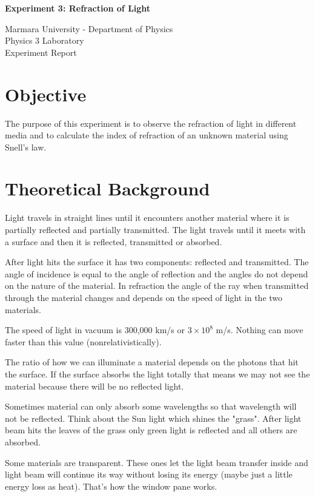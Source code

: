 \documentclass[12pt, a4paper]{article}
\begin{document}
\begin{center}
	\Large \textbf{Experiment 3: Refraction of Light}
	\vspace{0.5cm}
	
	\normalsize Marmara University - Department of Physics \\
	Physics 3 Laboratory \\
	Experiment Report
	\vspace{0.5cm}
\end{center}

\section{Objective}
The purpose of this experiment is to observe the refraction of light in different media and to calculate the index of refraction of an unknown material using Snell's law.

\section{Theoretical Background}
Light travels in straight lines until it encounters another material where it is partially reflected and partially transmitted. The light travels until it meets with a surface and then it is reflected, transmitted or absorbed.

After light hits the surface it has two components: reflected and transmitted. The angle of incidence is equal to the angle of reflection and the angles do not depend on the nature of the material. In refraction the angle of the ray when transmitted through the material changes and depends on the speed of light in the two materials.

The speed of light in vacuum is 300,000 km/s or $3 \times 10^8$ m/s. Nothing can move faster than this value (nonrelativistically).

The ratio of how we can illuminate a material depends on the photons that hit the surface. If the surface absorbs the light totally that means we may not see the material because there will be no reflected light.

Sometimes material can only absorb some wavelengths so that wavelength will not be reflected. Think about the Sun light which shines the "grass". After light beam hits the leaves of the grass only green light is reflected and all others are absorbed.

Some materials are transparent. These ones let the light beam transfer inside and light beam will continue its way without losing its energy (maybe just a little energy loss as heat). That's how the window pane works.
\end{document}
